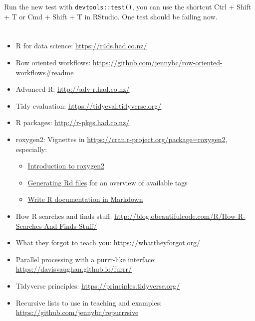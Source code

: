 \documentclass[]{book}
\begin{document}
Run the new test with \texttt{devtools::test()}, you can use the shortcut Ctrl + Shift + T or Cmd + Shift + T in RStudio.
One test should be failing now.

\hypertarget{section-2}{%
\chapter{}\label{section-2}}

\begin{itemize}
\item
  R for data science: \url{https://r4ds.had.co.nz/}
\item
  Row oriented workflows: \url{https://github.com/jennybc/row-oriented-workflows\#readme}
\item
  Advanced R: \url{http://adv-r.had.co.nz/}
\item
  Tidy evaluation: \url{https://tidyeval.tidyverse.org/}
\item
  R packages: \url{http://r-pkgs.had.co.nz/}
\item
  roxygen2: Vignettes in \url{https://cran.r-project.org/package=roxygen2}, especially:

  \begin{itemize}
  \item
    \href{https://cran.r-project.org/web/packages/roxygen2/vignettes/roxygen2.html}{Introduction to roxygen2}
  \item
    \href{https://cran.r-project.org/web/packages/roxygen2/vignettes/rd.html}{Generating Rd files} for an overview of available tags
  \item
    \href{https://cran.r-project.org/web/packages/roxygen2/vignettes/markdown.html}{Write R documentation in Markdown}
  \end{itemize}
\item
  How R searches and finds stuff: \url{http://blog.obeautifulcode.com/R/How-R-Searches-And-Finds-Stuff/}
\item
  What they forgot to teach you: \url{https://whattheyforgot.org/}
\item
  Parallel processing with a purrr-like interface: \url{https://davisvaughan.github.io/furrr/}
\item
  Tidyverse principles: \url{https://principles.tidyverse.org/}
\item
  Recursive lists to use in teaching and examples: \url{https://github.com/jennybc/repurrrsive}
\end{itemize}


\end{document}
